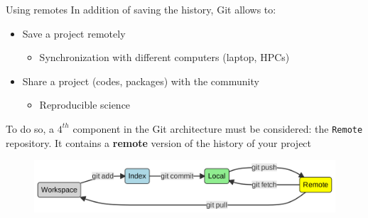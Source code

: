 \documentclass[10pt]{beamer}
\begin{document}
\begin{frame}[fragile]{Using remotes}
\protect\hypertarget{using-remotes}{}
In addition of saving the history, Git allows
to:

\begin{itemize}
\item
  Save a project remotely

  \begin{itemize}
  \item
    Synchronization with different computers (laptop, HPCs)
  \end{itemize}
\item
  Share a project (codes, packages) with the community

  \begin{itemize}
  \item
    Reproducible science
  \end{itemize}
\end{itemize}

To do so, a \(4^{th}\) component in the Git architecture must be
considered: the \texttt{Remote} repository. It contains a \textbf{remote} version of the history of
your project

\begin{figure}[H]

{\centering \includegraphics[width=\textwidth]{mermaid/mermaid-figure-15.png}

}

\end{figure}

\end{frame}
\end{document}

